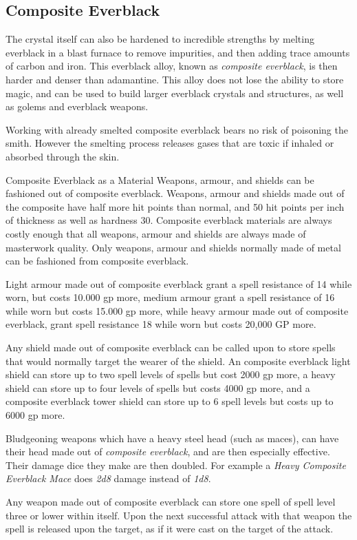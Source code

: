\subsection{Composite Everblack}
\label{sec:Composite Everblack}

The crystal itself can also be hardened to incredible strengths by melting
everblack in a blast furnace to remove impurities, and then adding trace
amounts of carbon and iron. This everblack alloy, known as \emph{composite
everblack}, is then harder and denser than adamantine. This alloy does not lose
the ability to store magic, and can be used to build larger everblack crystals
and structures, as well as golems and everblack weapons.

Working with already smelted composite everblack bears no risk of poisoning the
smith. However the smelting process releases gases that are toxic if inhaled
or absorbed through the skin.

\begin{35e}{Composite Everblack as a Material}
  Weapons, armour, and shields can be fashioned out of composite everblack.
  Weapons, armour and shields made out of the composite have half more hit
  points than normal, and 50 hit points per inch of thickness as well as
  hardness 30. Composite everblack materials are always costly enough that all
  weapons, armour and shields are always made of masterwork quality.  Only
  weapons, armour and shields normally made of metal can be fashioned from
  composite everblack.

  Light armour made out of composite everblack grant a spell resistance of 14
  while worn, but costs 10.000 gp more, medium armour grant a spell resistance
  of 16 while worn but costs 15.000 gp more, while heavy armour made out of
  composite everblack, grant spell resistance 18 while worn but costs 20,000
  GP more.

  Any shield made out of composite everblack can be called upon to store
  spells that would normally target the wearer of the shield. An composite
  everblack light shield can store up to two spell levels of spells but cost
  2000 gp more, a heavy shield can store up to four levels of spells but costs
  4000 gp more, and a composite everblack tower shield can store up to 6 spell
  levels but costs up to 6000 gp more.

  Bludgeoning weapons which have a heavy steel head (such as maces), can have
  their head made out of \emph{composite everblack}, and are then especially
  effective. Their damage dice they make are then doubled. For example a
  \emph{Heavy Composite Everblack Mace} does \emph{2d8} damage instead of
  \emph{1d8}.

  Any weapon made out of composite everblack can store one spell of spell
  level three or lower within itself. Upon the next successful attack with
  that weapon the spell is released upon the target, as if it were cast on
  the target of the attack.
\end{35e}

